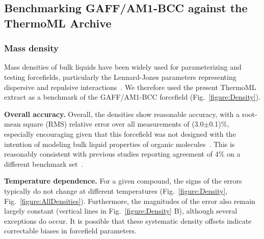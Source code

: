 \documentclass[aip, jcp, reprint]{revtex4-1}  %
\begin{document}

\subsection{Benchmarking GAFF/AM1-BCC against the ThermoML Archive}

\subsubsection{Mass density}

Mass densities of bulk liquids have been widely used for parameterizing and testing forcefields, particularly the Lennard-Jones parameters representing dispersive and repulsive interactions~\cite{jorgensen1983comparison, jorgensen1984optimized}.
We therefore used the present ThermoML extract as a benchmark of the GAFF/AM1-BCC forcefield (Fig.~\ref{figure:Density}).  

{\bf Overall accuracy.}
Overall, the densities show reasonable accuracy, with a root-mean square (RMS) relative error over all measurements of (3.0$\pm$0.1)\%, especially encouraging given that this forcefield was not designed with the intention of modeling bulk liquid properties of organic molecules~\cite{gaff,gaff2}.
This is reasonably consistent with previous studies reporting agreement of 4\% on a different benchmark set~\cite{caleman2011force}.

{\bf Temperature dependence.}
For a given compound, the signs of the errors typically do not change at different temperatures (Fig.~\ref{figure:Density}, Fig.~\ref{figure:AllDensities}).  
Furthermore, the magnitudes of the error also remain largely constant (vertical lines in Fig.~\ref{figure:Density} B), although several exceptions do occur.  
It is possible that these systematic density offsets indicate correctable biases in forcefield parameters.  
\end{document}
